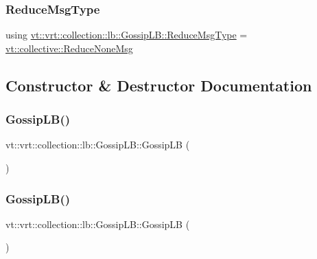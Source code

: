 \subsubsection{\texorpdfstring{Reduce\+Msg\+Type}{ReduceMsgType}}
{\footnotesize\ttfamily using \hyperlink{structvt_1_1vrt_1_1collection_1_1lb_1_1_gossip_l_b_ad251f887a319f433771b084187ef6089}{vt\+::vrt\+::collection\+::lb\+::\+Gossip\+L\+B\+::\+Reduce\+Msg\+Type} =  \hyperlink{namespacevt_1_1collective_aa439a90f05078f2bcf918641c951946f}{vt\+::collective\+::\+Reduce\+None\+Msg}}



\subsection{Constructor \& Destructor Documentation}
\mbox{\label{structvt_1_1vrt_1_1collection_1_1lb_1_1_gossip_l_b_a76e6ae6cec011c88a60327b4d7b590eb}} 
\subsubsection{\texorpdfstring{Gossip\+L\+B()}{GossipLB()}\hspace{0.1cm}{\footnotesize\ttfamily [1/2]}}
{\footnotesize\ttfamily vt\+::vrt\+::collection\+::lb\+::\+Gossip\+L\+B\+::\+Gossip\+LB (\begin{DoxyParamCaption}{ }\end{DoxyParamCaption})\hspace{0.3cm}{\ttfamily [default]}}

\mbox{\label{structvt_1_1vrt_1_1collection_1_1lb_1_1_gossip_l_b_a2b970a7f33caac706c6702145856fda1}} 
\subsubsection{\texorpdfstring{Gossip\+L\+B()}{GossipLB()}\hspace{0.1cm}{\footnotesize\ttfamily [2/2]}}
{\footnotesize\ttfamily vt\+::vrt\+::collection\+::lb\+::\+Gossip\+L\+B\+::\+Gossip\+LB (\begin{DoxyParamCaption}\item[{\hyperlink{structvt_1_1vrt_1_1collection_1_1lb_1_1_gossip_l_b}{Gossip\+LB} const \&}]{ }\end{DoxyParamCaption})\hspace{0.3cm}{\ttfamily [delete]}}

